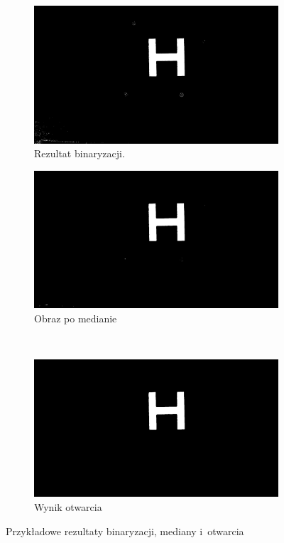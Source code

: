 \begin{figure}
	\centering
	\begin{subfigure}{0.7\textwidth}
		\centering
		\includegraphics[width=\textwidth]{bin.jpg}
		\caption{Rezultat binaryzacji.}
		\label{fig:bin_1}
	\end{subfigure}
	\begin{subfigure}{0.7\textwidth}
		\centering
		\includegraphics[width=\textwidth]{median.jpg}
		\caption{Obraz po medianie}
		\label{fig:median_1}
	\end{subfigure}\\
	\begin{subfigure}{0.7\textwidth}
		\centering
		\includegraphics[width=\textwidth]{opened.jpg}
		\caption{Wynik otwarcia}
		\label{fig:opened_1}
	\end{subfigure}
	\caption{Przykładowe rezultaty binaryzacji, mediany i~otwarcia}
	\label{fig:operacje}
\end{figure}


